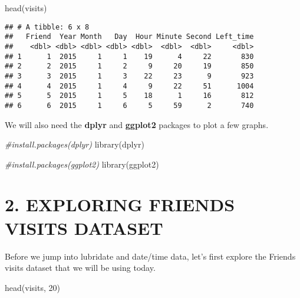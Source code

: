 \documentclass[
]{book}
\newenvironment{Shaded}{\begin{snugshade}}{\end{snugshade}}
\newcommand{\CommentTok}[1]{\textcolor[rgb]{0.56,0.35,0.01}{\textit{#1}}}
\newcommand{\DecValTok}[1]{\textcolor[rgb]{0.00,0.00,0.81}{#1}}
\newcommand{\FunctionTok}[1]{\textcolor[rgb]{0.00,0.00,0.00}{#1}}
\newcommand{\NormalTok}[1]{#1}
\begin{document}
\begin{Shaded}
\begin{Highlighting}[]
\FunctionTok{head}\NormalTok{(visits)}
\end{Highlighting}
\end{Shaded}

\begin{verbatim}
## # A tibble: 6 x 8
##   Friend  Year Month   Day  Hour Minute Second Left_time
##    <dbl> <dbl> <dbl> <dbl> <dbl>  <dbl>  <dbl>     <dbl>
## 1      1  2015     1     1    19      4     22       830
## 2      2  2015     1     2     9     20     19       850
## 3      3  2015     1     3    22     23      9       923
## 4      4  2015     1     4     9     22     51      1004
## 5      5  2015     1     5    18      1     16       812
## 6      6  2015     1     6     5     59      2       740
\end{verbatim}

We will also need the \textbf{dplyr} and \textbf{ggplot2} packages to plot a few graphs.

\begin{Shaded}
\begin{Highlighting}[]
\CommentTok{\#install.packages(dplyr)}
\FunctionTok{library}\NormalTok{(dplyr)}

\CommentTok{\#install.packages(ggplot2)}
\FunctionTok{library}\NormalTok{(ggplot2)}
\end{Highlighting}
\end{Shaded}

\hypertarget{exploring-friends-visits-dataset}{%
\section{2. EXPLORING FRIENDS VISITS DATASET}\label{exploring-friends-visits-dataset}}

Before we jump into lubridate and date/time data, let's first explore the Friends visits dataset that we will be using today.

\begin{Shaded}
\begin{Highlighting}[]
\FunctionTok{head}\NormalTok{(visits, }\DecValTok{20}\NormalTok{)}
\end{Highlighting}
\end{Shaded}
\end{document}
